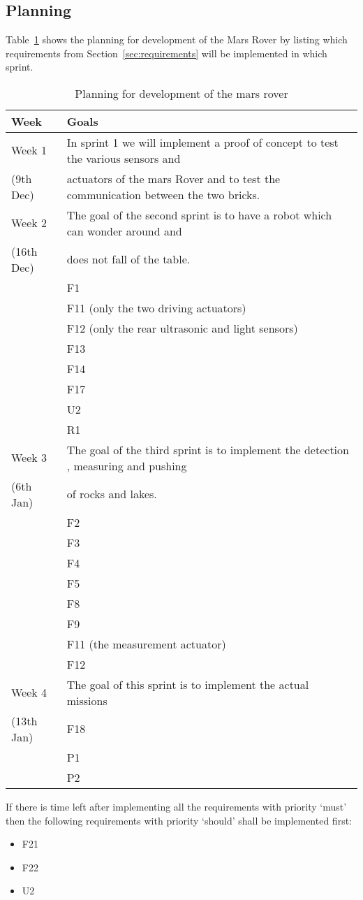 \subsection{Planning}
Table~\ref{tbl:planning} shows the planning for development of the Mars Rover by
listing which requirements from Section~\ref{sec:requirements} will be
implemented in which sprint.
\begin{table}[H]
	\centering
	\begin{tabular}{|l|l|}
		\hline
		Week 	& Goals \\  \hline
		\hline
		Week 1 		& In sprint 1 we will implement a proof of concept to test
						the various sensors and\\   
		(9th Dec)	&	actuators of the mars Rover
						and to test the communication between the two bricks.\\   
		\hline
		Week 2  	& 	The goal of the second sprint is to have a robot which 
						can wonder around and \\  
		(16th Dec)	&	does not fall of the table.\\  
					&	\tabitem F1\\  
					&	\tabitem F11 (only the two driving actuators)\\  
					&	\tabitem F12 (only the rear ultrasonic 
										and light sensors)\\  
					&	\tabitem F13 \\  
					&	\tabitem F14\\  
					&	\tabitem F17\\  
					&	\tabitem U2\\  
					&	\tabitem R1\\  
		\hline
		Week 3		& The goal of the third sprint is to implement the detection
						, measuring and pushing \\  
		(6th Jan)	& of rocks and lakes. \\  
					& 	\tabitem F2\\  
					& 	\tabitem F3\\  
					& 	\tabitem F4\\  
					& 	\tabitem F5\\  
					& 	\tabitem F8\\  
					&  	\tabitem F9\\  
					& 	\tabitem F11 (the measurement actuator)\\  
					& 	\tabitem F12\\  
		\hline
		Week 4 		& The goal of this sprint is to implement the actual 
						missions\\  
		(13th Jan) 	& 	\tabitem F18\\  
					& 	\tabitem P1\\  
					&	\tabitem P2\\  
		\hline
	\end{tabular}
\caption{Planning for development of the mars rover}
\label{tbl:planning}
\end{table}
If there is time left after implementing all the requirements with priority 
`must' then the following requirements with priority `should' shall be 
implemented first:
\begin{itemize}
	\item F21 
	\item F22
	\item U2
\end{itemize}